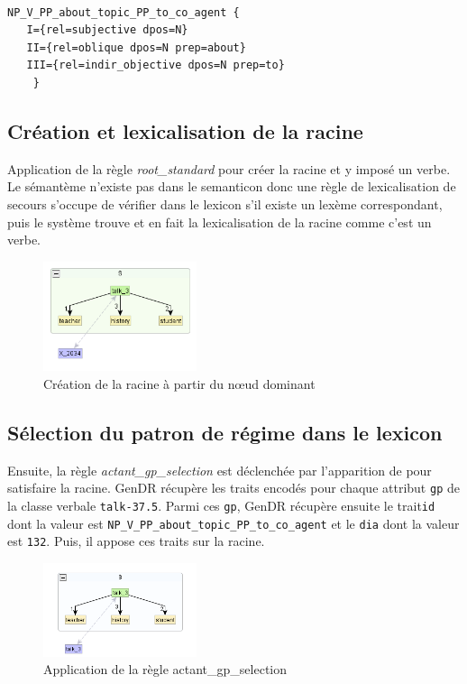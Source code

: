 \begin{lstlisting}[language=mate, caption=Propriétés syntaxiques de \texttt{NP\_V\_PP\_about\_topic\_PP\_to\_co\_agent} , label=gpexemple]

NP_V_PP_about_topic_PP_to_co_agent {
   I={rel=subjective dpos=N}
   II={rel=oblique dpos=N prep=about}
   III={rel=indir_objective dpos=N prep=to}
	}
\end{lstlisting}

\subsection{Création et lexicalisation de la racine}
Application de la règle \emph{root\_standard} pour créer la racine et y imposé un verbe. Le sémantème  n'existe pas dans le semanticon donc une règle de lexicalisation de secours s'occupe de vérifier dans le lexicon s'il existe un lexème correspondant, puis le système trouve  et en fait la lexicalisation de la racine comme c'est un verbe.

\begin{figure}[htb]
	\centering
	\includegraphics[width=0.4\textwidth, trim = {0cm 0cm 0cm 0cm},clip]{ch6/figs/root.png}
	\caption{Création de la racine à partir du n\oe{}ud dominant}
	\label{deroulement0}
\end{figure}


\subsection{Sélection du patron de régime dans le lexicon}
Ensuite, la règle \emph{actant\_gp\_selection} est déclenchée par l'apparition de  pour satisfaire la racine. GenDR récupère les traits encodés pour chaque attribut \texttt{gp} de la classe verbale \texttt{talk-37.5}. Parmi ces \texttt{gp}, GenDR récupère ensuite le trait\texttt{id} dont la valeur est \texttt{NP\_V\_PP\_about\_topic\_PP\_to\_co\_agent} et le \texttt{dia} dont la valeur est \texttt{132}. Puis, il appose ces traits sur la racine.

\begin{figure}[htb]
	\centering
	\includegraphics[width=0.4\textwidth, trim = {0cm 0cm 0cm 0cm},clip]{ch6/figs/selectiongp.png}
	\caption{Application de la règle actant\_gp\_selection}
	\label{deroulement1}
\end{figure}

